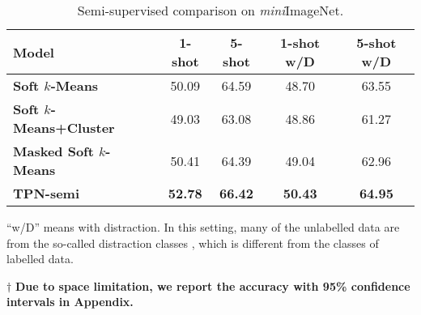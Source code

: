 \documentclass{article} \usepackage{iclr2019_conference,times}
\def\mini{{\textit{mini}ImageNet}}
\begin{document}
\begin{table}[ht]
\centering
\begin{threeparttable}
\small
\caption{Semi-supervised comparison on \mini.}
\label{semi-mini}
\begin{tabular}{lcccc}
\hline
Model   & \multicolumn{1}{c}{1-shot} & \multicolumn{1}{c}{5-shot} & \multicolumn{1}{c}{1-shot w/D} & \multicolumn{1}{c}{5-shot w/D} \\ \hline
\textbf{Soft $k$-Means~\citep{semi-proto}}          & 50.09 & 64.59 & 48.70 & 63.55 \\
\textbf{Soft $k$-Means+Cluster~\citep{semi-proto}}  & 49.03 & 63.08 & 48.86 & 61.27 \\
\textbf{Masked Soft $k$-Means~\citep{semi-proto}}   & 50.41 & 64.39 & 49.04 & 62.96 \\ \hline
\textbf{TPN-semi}                                   & \textbf{52.78} & \textbf{66.42} & \textbf{50.43} & \textbf{64.95}\\ \hline
\end{tabular}
\begin{tablenotes}
  	\item * ``w/D'' means with distraction. In this setting, many of the unlabelled data are from the so-called distraction classes , which is different from the classes of labelled data.
  	\item $\dagger$ \textbf{Due to space limitation, we report the accuracy with 95\% confidence intervals in Appendix.}
\end{tablenotes} 
\end{threeparttable}
\end{table}
\end{document}
